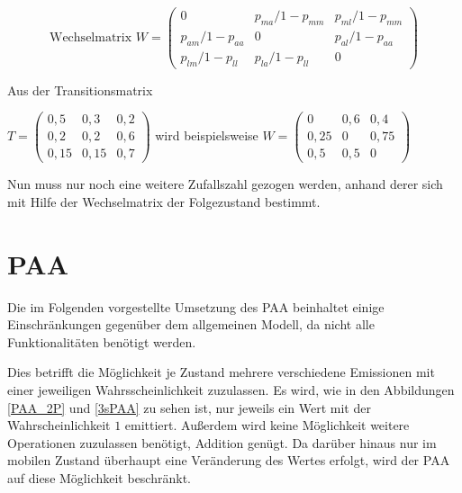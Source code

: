 \begin{equation}
\text{Wechselmatrix } W = 
\begin{pmatrix}
0 &  p_{ma}/1-p_{mm} & p_{ml}/1-p_{mm} \\
p_{am}/1- p_{aa} & 0 & p_{al}/1- p_{aa} \\
p_{lm}/1-p_{ll} &  p_{la}/1-p_{ll} & 0 
\end{pmatrix}  
\end{equation}

Aus der Transitionsmatrix

$T= 
\begin{pmatrix}
0,5 & 0,3 & 0,2 \\
0,2 & 0,2 & 0,6 \\
0,15 & 0,15 & 0,7 
\end{pmatrix}
$  
wird beispielsweise  
$W= 
\begin{pmatrix}
0 & 0,6 & 0,4 \\
0,25 & 0 & 0,75 \\
0,5 & 0,5 & 0 
\end{pmatrix}
$  

Nun muss nur noch eine weitere Zufallszahl gezogen werden, anhand derer sich mit Hilfe der Wechselmatrix der Folgezustand bestimmt.


\section{PAA}

Die im Folgenden vorgestellte Umsetzung des PAA beinhaltet einige Einschränkungen gegenüber dem allgemeinen Modell, da nicht alle Funktionalitäten benötigt werden.

Dies betrifft die Möglichkeit je Zustand mehrere verschiedene Emissionen mit einer jeweiligen Wahrsscheinlichkeit zuzulassen. Es wird, wie in den Abbildungen \ref{PAA_2P} und \ref{3sPAA} zu sehen ist, nur jeweils ein Wert mit der Wahrscheinlichkeit $1$ emittiert. Außerdem wird keine Möglichkeit weitere Operationen zuzulassen benötigt, Addition genügt. Da darüber hinaus nur im mobilen Zustand überhaupt eine Veränderung des Wertes erfolgt, wird der PAA auf diese Möglichkeit beschränkt.

